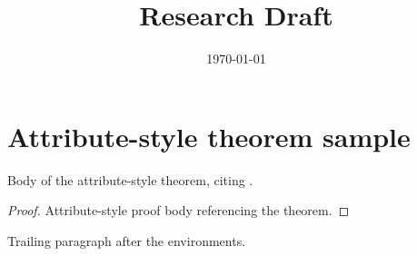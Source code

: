 \documentclass{amsart}
\title{Research Draft}
\date{\today}
\begin{document}
\maketitle
\tableofcontents

\newpage

\section{Attribute-style theorem
sample}\label{attribute-style-theorem-sample}

\begin{theorem}[T]\label{thm:x}

Body of the attribute-style theorem, citing \autocite[Lem. 7.1]{Ols04}.

\end{theorem}

\begin{proof}

Attribute-style proof body referencing the theorem.

\end{proof}

Trailing paragraph after the environments.

\clearpage
 \printbibliography
\end{document}
